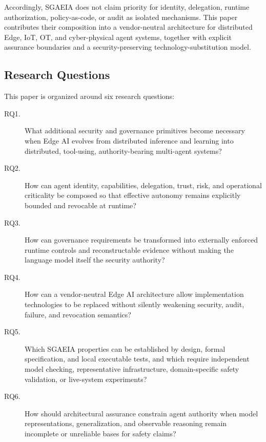 \documentclass[11pt]{article}
\newcommand{\sgaeia}{\textsc{SGAEIA}}
\begin{document}
Accordingly, \sgaeia{} does not claim priority for identity, delegation, runtime authorization, policy-as-code, or audit as isolated mechanisms. This paper contributes their composition into a vendor-neutral architecture for distributed Edge, IoT, OT, and cyber-physical agent systems, together with explicit assurance boundaries and a security-preserving technology-substitution model.

\subsection{Research Questions}
This paper is organized around six research questions:

\begin{description}
\item[RQ1.] What additional security and governance primitives become necessary when Edge AI evolves from distributed inference and learning into distributed, tool-using, authority-bearing multi-agent systems?
\item[RQ2.] How can agent identity, capabilities, delegation, trust, risk, and operational criticality be composed so that effective autonomy remains explicitly bounded and revocable at runtime?
\item[RQ3.] How can governance requirements be transformed into externally enforced runtime controls and reconstructable evidence without making the language model itself the security authority?
\item[RQ4.] How can a vendor-neutral Edge AI architecture allow implementation technologies to be replaced without silently weakening security, audit, failure, and revocation semantics?
\item[RQ5.] Which \sgaeia{} properties can be established by design, formal specification, and local executable tests, and which require independent model checking, representative infrastructure, domain-specific safety validation, or live-system experiments?
\item[RQ6.] How should architectural assurance constrain agent authority when model representations, generalization, and observable reasoning remain incomplete or unreliable bases for safety claims?
\end{description}
\end{document}
